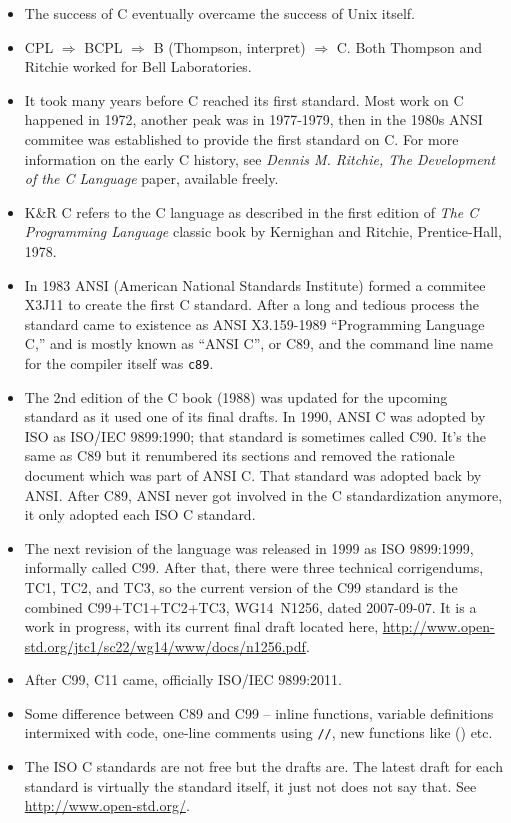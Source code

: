 \begin{itemize}
\item The success of C eventually overcame the success of Unix itself.
\item CPL $\Rightarrow$ BCPL $\Rightarrow$ B (Thompson, interpret)
$\Rightarrow$ C.  Both Thompson and Ritchie worked for Bell Laboratories.
\item It took many years before C reached its first standard.  Most work on C
happened in 1972, another peak was in 1977-1979, then in the 1980s ANSI commitee
was established to provide the first standard on C.  For more information on the
early C history, see \emph{Dennis M. Ritchie, The Development of the C Language}
paper, available freely.
\item K\&R C refers to the C language as described in the first edition of
\emph{The C Prog\-ramm\-ing Language} classic book by Kernighan and Ritchie,
Prentice-Hall, 1978.
\item In 1983 ANSI (American National Standards Institute) formed a commitee
X3J11 to create the first C standard.  After a long and tedious process the
standard came to existence as ANSI X3.159-1989 ``Programming Language C,'' and
is mostly known as ``ANSI C'', or C89, and the command line name for the
compiler itself was \texttt{c89}.
\item The 2nd edition of the C book (1988) was updated for the upcoming
standard as it used one of its final drafts.  In 1990, ANSI C was adopted by ISO
as ISO/IEC 9899:1990; that standard is sometimes called C90.  It's the same as
C89 but it renumbered its sections and removed the rationale document which was
part of ANSI C.  That standard was adopted back by ANSI.  After C89, ANSI never
got involved in the C standardization anymore, it only adopted each ISO C
standard.
\item The next revision of the language was released in 1999 as ISO 9899:1999,
informally called C99.  After that, there were three technical corrigendums,
TC1, TC2, and TC3, so the current version of the C99 standard is the combined
C99+TC1+TC2+TC3, WG14~N1256, dated 2007-09-07.  It is a work in progress,
with its current final draft located here,
\url{http://www.open-std.org/jtc1/sc22/wg14/www/docs/n1256.pdf}.
\item After C99, C11 came, officially ISO/IEC 9899:2011.
\item Some difference between C89 and C99 -- inline functions, variable
definitions intermixed with code, one-line comments using \texttt{//}, new
functions like () etc.
\item The ISO C standards are not free but the drafts are.  The latest draft for
each standard is virtually the standard itself, it just not does not say that.
See \url{http://www.open-std.org/}.
\end{itemize}

